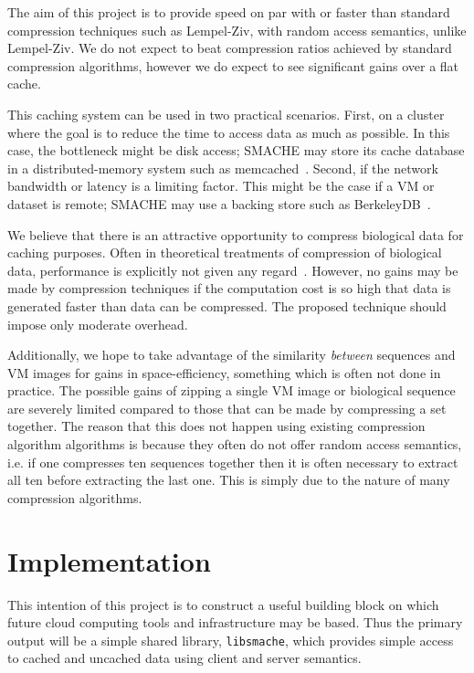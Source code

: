 \documentclass{article}[12pt]
\begin{document}
The aim of this project is to provide speed on par with or faster than standard
compression techniques such as Lempel-Ziv, with random access semantics, unlike
Lempel-Ziv.  We do not expect to beat compression ratios achieved by standard
compression algorithms, however we do expect to see significant gains over a
flat cache.

This caching system can be used in two practical scenarios.  First, on a
cluster where the goal is to reduce the time to access data as much as
possible.  In this case, the bottleneck might be disk access; SMACHE may store
its cache database in a distributed-memory system such as
memcached~\cite{memcached}.  Second, if the network bandwidth or latency is a
limiting factor.  This might be the case if a VM or dataset is remote; SMACHE
may use a backing store such as BerkeleyDB~\cite{berkeleydb}.

We believe that there is an attractive opportunity to compress biological data
for caching purposes.  Often in theoretical treatments of compression of
biological data, performance is explicitly not given any
regard~\cite{statistical}.  However, no gains may be made by compression
techniques if the computation cost is so high that data is generated faster
than data can be compressed.  The proposed technique should impose only
moderate overhead.

Additionally, we hope to take advantage of the similarity {\em between}
sequences and VM images for gains in space-efficiency, something which is often
not done in practice.  The possible gains of zipping a single VM image or
biological sequence are severely limited compared to those that can be made by
compressing a set together.  The reason that this does not happen using
existing compression algorithm algorithms is because they often do not offer
random access semantics, i.e. if one compresses ten sequences together then it
is often necessary to extract all ten before extracting the last one.  This is
simply due to the nature of many compression algorithms.

\section{Implementation}
\label{sec:implementation}

This intention of this project is to construct a useful building block on which
future cloud computing tools and infrastructure may be based.  Thus the primary
output will be a simple shared library, {\tt libsmache}, which provides simple
access to cached and uncached data using client and server semantics.
\end{document}

